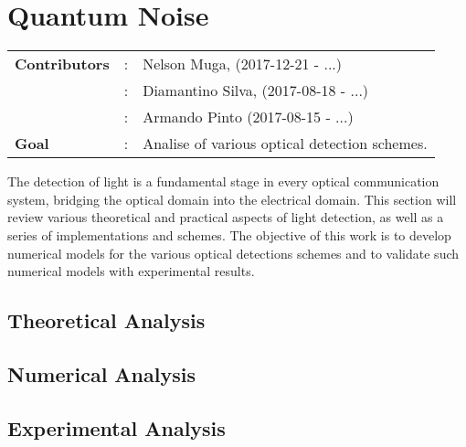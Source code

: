 \clearpage
\section{Quantum Noise}

\begin{tcolorbox}	
\begin{tabular}{p{2.75cm} p{0.2cm} p{10.5cm}}
\textbf{Contributors}  &:& Nelson Muga, (2017-12-21 - ...)\\
                       &:& Diamantino Silva, (2017-08-18 - ...)\\
                       &:& Armando Pinto (2017-08-15 - ...)\\
\textbf{Goal}          &:& Analise of various optical detection schemes.\\
\end{tabular}
\end{tcolorbox}
%
\vspace{2em}
%
The detection of light is a fundamental stage in every optical communication system, bridging the optical domain into the electrical domain. This section will review various theoretical and practical aspects of light detection, as well as a series of implementations and schemes.
The objective of this work is to develop numerical models for the various optical detections schemes and to validate such numerical models with experimental results.\\

\subsection{Theoretical Analysis}
\subsection{Numerical Analysis}
\subsection{Experimental Analysis}


